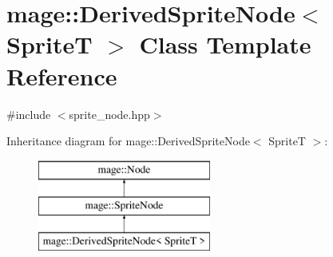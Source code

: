 \hypertarget{classmage_1_1_derived_sprite_node}{}\section{mage\+:\+:Derived\+Sprite\+Node$<$ SpriteT $>$ Class Template Reference}
\label{classmage_1_1_derived_sprite_node}


{\ttfamily \#include $<$sprite\+\_\+node.\+hpp$>$}

Inheritance diagram for mage\+:\+:Derived\+Sprite\+Node$<$ SpriteT $>$\+:\begin{figure}[H]
\begin{center}
\leavevmode
\includegraphics[height=3.000000cm]{classmage_1_1_derived_sprite_node}
\end{center}
\end{figure}
